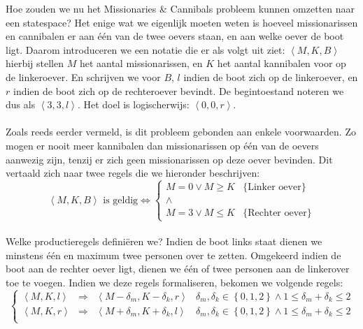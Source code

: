 \begin{leftbar}
Hoe zouden we nu het Missionaries \& Cannibals probleem kunnen omzetten naar een statespace? Het enige wat we eigenlijk moeten weten is hoeveel missionarissen en cannibalen er aan \'e\'en van de twee oevers staan, en aan welke oever de boot ligt. Daarom introduceren we een notatie die er als volgt uit ziet: $\left\langle M,K,B\right\rangle$ hierbij stellen $M$ het aantal missionarissen, en $K$ het aantal kannibalen voor op de linkeroever. En schrijven we voor $B$, $l$ indien de boot zich op de linkeroever, en $r$ indien de boot zich op de rechteroever bevindt. De begintoestand noteren we dus als $\left\langle3,3,l\right\rangle$. Het doel is logischerwijs: $\left\langle0,0,r\right\rangle$.
\paragraph{}
Zoals reeds eerder vermeld, is dit probleem gebonden aan enkele voorwaarden. Zo mogen er nooit meer kannibalen dan missionarissen op \'e\'en van de oevers aanwezig zijn, tenzij er zich geen missionarissen op deze oever bevinden. Dit vertaald zich naar twee regels die we hieronder beschrijven:
\begin{equation}
\left\langle M,K,B\right\rangle\mbox{ is geldig}\Leftrightarrow\left\{
\begin{array}{cl}
M=0\vee M\geq K&\mbox{\{Linker oever\}}\\
\wedge\\
M=3\vee M\leq K&\mbox{\{Rechter oever\}}
\end{array}\right.
\end{equation}
\paragraph{}
Welke productieregels defini\"eren we? Indien de boot links staat dienen we minstens \'e\'en en maximum twee personen over te zetten. Omgekeerd indien de boot aan de rechter oever ligt, dienen we \'e\'en of twee personen aan de linkerover toe te voegen. Indien we deze regels formaliseren, bekomen we volgende regels:
\begin{equation}
\left\{\begin{array}{rcl|l}
\left\langle M,K,l\right\rangle&\Rightarrow&\left\langle M-\delta_m,K-\delta_k,r\right\rangle&\delta_m,\delta_k\in\left\{0,1,2\right\}\wedge1\leq\delta_m+\delta_k\leq 2\\
\left\langle M,K,r\right\rangle&\Rightarrow&\left\langle M+\delta_m,K+\delta_k,l\right\rangle&\delta_m,\delta_k\in\left\{0,1,2\right\}\wedge1\leq\delta_m+\delta_k\leq 2\\
\end{array}\right.
\end{equation}
\end{leftbar}
